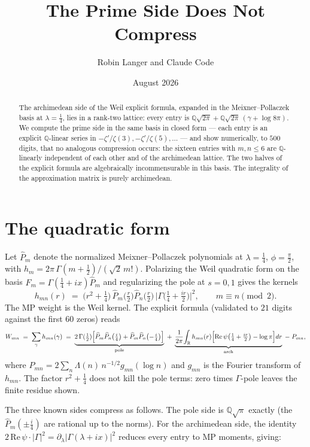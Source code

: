 \documentclass[11pt,a4paper]{article}
\title{\textbf{The Prime Side Does Not Compress}}
\author{Robin Langer and Claude Code}
\date{August 2026}
\theoremstyle{definition}
\newcommand{\R}{\mathbb{R}}
\newcommand{\Q}{\mathbb{Q}}
\newcommand{\G}{\Gamma}
\newcommand{\La}{\Lambda}
\begin{document}
\maketitle

\begin{abstract}
The archimedean side of the Weil explicit formula, expanded in the
Meixner--Pollaczek basis at $\lambda = \tfrac14$, lies in a rank-two
lattice: every entry is $\Q\sqrt{2\pi} + \Q\sqrt{2\pi}\,(\gamma +
\log 8\pi)$. We compute the prime side in the same basis in closed
form --- each entry is an explicit $\Q$-linear series in
$-\zeta'/\zeta(3), -\zeta'/\zeta(5), \dots$ --- and show numerically,
to $500$ digits, that no analogous compression occurs: the sixteen
entries with $m,n \le 6$ are $\Q$-linearly independent of each other
and of the archimedean lattice. The two halves of the explicit
formula are algebraically incommensurable in this basis. The
integrality of the approximation matrix is purely archimedean.
\end{abstract}

\section{The quadratic form}

Let $\widehat{P}_m$ denote the normalized Meixner--Pollaczek
polynomials at $\lambda = \tfrac14$, $\phi = \tfrac\pi2$, with
$h_m = 2\pi\,\G(m+\tfrac12)/(\sqrt2\,m!)$. Polarizing the Weil
quadratic form on the basis $F_m = \G(\tfrac14 + ix)\widehat{P}_m$
and regularizing the pole at $s = 0, 1$ gives the kernels
\[
h_{mn}(r) \;=\; \bigl(r^2 + \tfrac14\bigr)\,
\widehat{P}_m\!\bigl(\tfrac r2\bigr)\widehat{P}_n\!\bigl(\tfrac r2\bigr)\,
\bigl|\G\bigl(\tfrac14 + \tfrac{ir}2\bigr)\bigr|^2 ,
\qquad m \equiv n \pmod 2 .
\]
The MP weight is the Weil kernel. The explicit formula
(validated to $21$ digits against the first $60$ zeros) reads
\[
W_{mn} \;=\; \sum_\gamma h_{mn}(\gamma)
\;=\; \underbrace{2\,\G(\tfrac12)\!
   \left[\widehat{P}_m\widehat{P}_n\bigl(\tfrac i4\bigr) +
         \widehat{P}_m\widehat{P}_n\bigl(-\tfrac i4\bigr)\right]}_{\text{pole}}
\;+\; \underbrace{\frac1{2\pi}\!\int_\R h_{mn}(r)
   \Bigl[\mathrm{Re}\,\psi\bigl(\tfrac14+\tfrac{ir}2\bigr) - \log\pi\Bigr]dr}_{\text{arch}}
\;-\; P_{mn},
\]
where $P_{mn} = 2\sum_n \La(n)\, n^{-1/2} g_{mn}(\log n)$ and
$g_{mn}$ is the Fourier transform of $h_{mn}$. The factor
$r^2 + \tfrac14$ does not kill the pole terms: zero times
$\G$-pole leaves the finite residue shown.

The three known sides compress as follows. The pole side is
$\Q\sqrt\pi$ exactly (the $\widehat{P}_m(\pm\tfrac i4)$ are rational
up to the norms). For the archimedean side, the identity
$2\,\mathrm{Re}\,\psi \cdot |\G|^2 = \partial_\lambda |\G(\lambda+ix)|^2$
reduces every entry to MP moments, giving:
\end{document}
